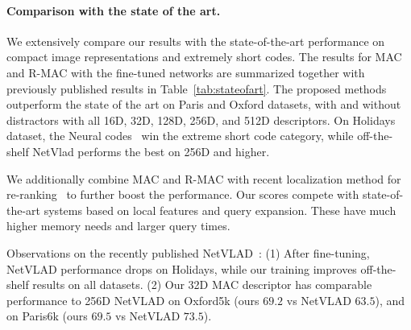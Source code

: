 %

%
\paragraph{Comparison with the state of the art.}
%
We extensively compare our results with the state-of-the-art performance on compact image representations and extremely short codes. The results for MAC and R-MAC with the fine-tuned networks are summarized together with previously published results in Table~\ref{tab:stateofart}. The proposed methods outperform the state of the art on Paris and Oxford datasets, with and without distractors with all 16D, 32D, 128D, 256D, and 512D descriptors. On Holidays dataset, the Neural codes~\cite{BSCL14} win the extreme short code category, while off-the-shelf NetVlad performs the best on 256D and higher. %

We additionally combine MAC and R-MAC with recent localization method for re-ranking~\cite{TSJ16} to further boost the performance. Our scores compete with state-of-the-art systems based on local features and query expansion. These have much higher memory needs and larger query times. 

Observations on the recently published NetVLAD~\cite{AGTPS15}:
(1) After fine-tuning, NetVLAD performance drops on Holidays, while our training improves off-the-shelf results on all datasets.
(2) Our 32D MAC descriptor has comparable performance to 256D NetVLAD  on Oxford5k (ours $69.2$ vs NetVLAD $63.5$), and on Paris6k (ours $69.5$ vs NetVLAD $73.5$).
